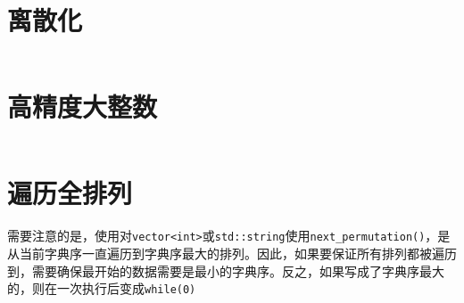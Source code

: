 \documentclass[openany,a4paper]{book}
\begin{document}
\section{离散化}
\inputminted{cpp}{Misc/Discretize.h}

\section{高精度大整数}
\inputminted{cpp}{Misc/BigInt.h}

\section{遍历全排列}
需要注意的是，使用对\verb|vector<int>|或\verb|std::string|使用\verb|next_permutation()|，是从当前字典序一直遍历到字典序最大的排列。因此，如果要保证所有排列都被遍历到，需要确保最开始的数据需要是最小的字典序。反之，如果写成了字典序最大的，则在一次执行后变成\verb|while(0)|
\inputminted{cpp}{Misc/next_permutation.h}
\end{document}
